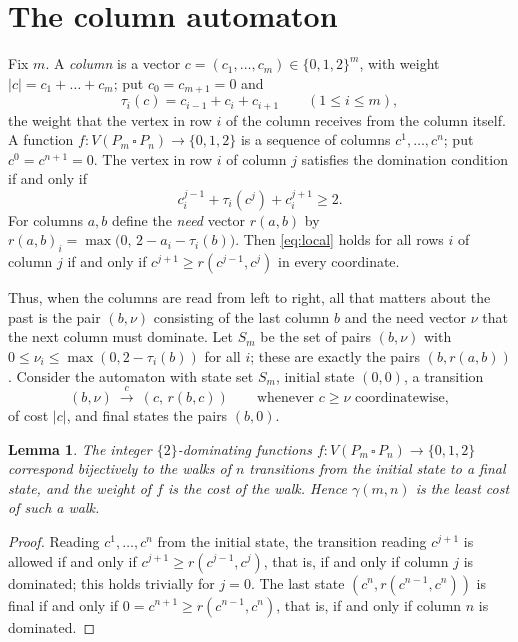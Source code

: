 \documentclass[12pt]{article}
\newcommand{\G}[2]{P_{#1}\,\square\,P_{#2}}
\theoremstyle{plain}
\newtheorem{lemma}[theorem]{Lemma}
\theoremstyle{remark}
\begin{document}
\section{The column automaton}\label{sec:automaton}

Fix $m$. A \emph{column} is a vector $c=(c_1,\dots,c_m)\in\{0,1,2\}^m$, with weight
$|c|=c_1+\dots+c_m$; put $c_0=c_{m+1}=0$ and
\[
\tau_i(c)=c_{i-1}+c_i+c_{i+1}\qquad(1\le i\le m),
\]
the weight that the vertex in row $i$ of the column receives from the column itself. A function
$f\colon V(\G mn)\to\{0,1,2\}$ is a sequence of columns $c^1,\dots,c^n$; put
$c^0=c^{n+1}=0$. The vertex in row $i$ of column $j$ satisfies the domination condition if and
only if
\begin{equation}\label{eq:local}
c^{j-1}_i+\tau_i(c^j)+c^{j+1}_i\ge2 .
\end{equation}
For columns $a,b$ define the \emph{need} vector $r(a,b)$ by
$r(a,b)_i=\max\bigl(0,\,2-a_i-\tau_i(b)\bigr)$. Then \eqref{eq:local} holds for all rows $i$ of
column $j$ if and only if $c^{j+1}\ge r(c^{j-1},c^j)$ in every coordinate.

Thus, when the columns are read from left to right, all that matters about the past is the pair
$(b,\nu)$ consisting of the last column $b$ and the need vector $\nu$ that the next column must
dominate. Let $S_m$ be the set of pairs $(b,\nu)$ with $0\le\nu_i\le\max(0,2-\tau_i(b))$ for all
$i$; these are exactly the pairs $(b,r(a,b))$. Consider the automaton with state set $S_m$,
initial state $(0,0)$, a transition
\[
(b,\nu)\ \xrightarrow{\;c\;}\ (c,\,r(b,c))\qquad\text{whenever } c\ge\nu\text{ coordinatewise},
\]
of cost $|c|$, and final states the pairs $(b,0)$.

\begin{lemma}\label{lem:bridge}
The integer $\{2\}$-dominating functions $f\colon V(\G mn)\to\{0,1,2\}$ correspond bijectively to
the walks of $n$ transitions from the initial state to a final state, and the weight of $f$ is
the cost of the walk. Hence $\gamma(m,n)$ is the least cost of such a walk.
\end{lemma}

\begin{proof}
Reading $c^1,\dots,c^n$ from the initial state, the transition reading $c^{j+1}$ is allowed if
and only if $c^{j+1}\ge r(c^{j-1},c^j)$, that is, if and only if column $j$ is dominated; this
holds trivially for $j=0$. The last state $(c^n,r(c^{n-1},c^n))$ is final if and only if
$0=c^{n+1}\ge r(c^{n-1},c^n)$, that is, if and only if column $n$ is dominated.
\end{proof}
\end{document}
